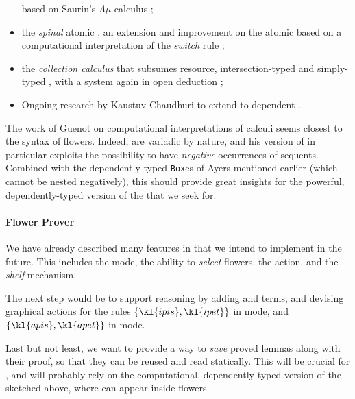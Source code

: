 \begin{scope}
\begin{itemize}
   based on Saurin's $\Lambda\mu$-calculus
  ;
  \item the \emph{spinal} atomic , an extension and
  improvement on the atomic  based on a computational
  interpretation of the \emph{switch} rule ;
  \item the \emph{collection calculus} that subsumes resource,
  intersection-typed and simply-typed , with a  system
  again in open deduction ;
  \item Ongoing research by Kaustuv Chaudhuri to extend  to
  dependent .
\end{itemize}
The work of Guenot on computational interpretations of  calculi
seems closest to the syntax of flowers. Indeed,  are variadic by
nature, and his version of  in particular exploits the
possibility to have \emph{negative} occurrences of sequents. Combined with the
dependently-typed \texttt{Box}es of Ayers mentioned earlier (which cannot be
nested negatively), this should provide great insights for the powerful,
dependently-typed version of the  that we seek for.

\paragraph{Flower Prover}

We have already described many features in  that we
intend to implement in the future. This includes the \Navigation mode, the
ability to \emph{select} flowers, the  \Proof action, and the
\emph{shelf} mechanism.

The next step would be to support  reasoning by adding  and
 terms, and devising graphical actions for the rules $\{\kl{ipis},
\kl{ipet}\}$ in \Proof mode, and $\{\kl{apis}, \kl{apet}\}$ in \Edit mode.

Last but not least, we want to provide a way to \emph{save} proved lemmas along
with their proof, so that they can be reused and read statically. This will be
crucial for \emph{}, and will probably rely on the computational,
dependently-typed version of the  sketched above, where  can appear inside flowers.


\end{scope}
